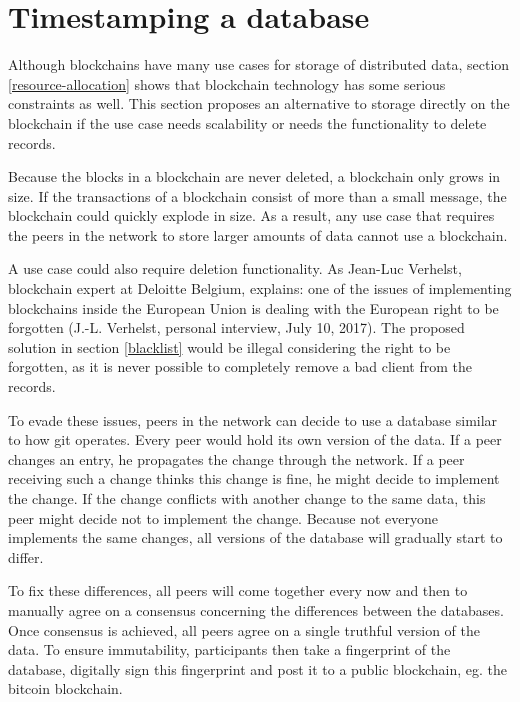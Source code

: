 \section{Timestamping a database}
\label{timestamping-db}


Although blockchains have many use cases for storage of distributed data, section \ref{resource-allocation} shows that blockchain technology has some serious constraints as well. This section proposes an alternative to storage directly on the blockchain if the use case needs scalability or needs the functionality to delete records. 

Because the blocks in a blockchain are never deleted, a blockchain only grows in size. If the transactions of a blockchain consist of more than a small message, the blockchain could quickly explode in size. As a result, any use case that requires the peers in the network to store larger amounts of data cannot use a blockchain.

A use case could also require deletion functionality. As Jean-Luc Verhelst, blockchain expert at Deloitte Belgium, explains: one of the issues of implementing blockchains inside the European Union is dealing with the European right to be forgotten (J.-L. Verhelst, personal interview, July 10, 2017). The proposed solution in section \ref{blacklist} would be illegal considering the right to be forgotten, as it is never possible to completely remove a bad client from the records. 

To evade these issues, peers in the network can decide to use a database similar to how git operates. Every peer would hold its own version of the data. If a peer changes an entry, he propagates the change through the network. If a peer receiving such a change thinks this change is fine, he might decide to implement the change. If the change conflicts with another change to the same data, this peer might decide not to implement the change. Because not everyone implements the same changes, all versions of the database will gradually start to differ. 

To fix these differences, all peers will come together every now and then to manually agree on a consensus concerning the differences between the databases. Once consensus is achieved, all peers agree on a single truthful version of the data. To ensure immutability, participants then take a fingerprint of the database, digitally sign this fingerprint and post it to a public blockchain, eg. the bitcoin blockchain.

